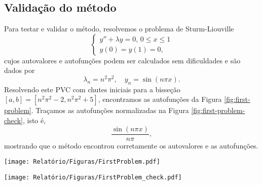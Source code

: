 \documentclass[twocolumn,showpacs,%
  nofootinbib,aps,superscriptaddress,%
  eqsecnum,prd,notitlepage,showkeys,10pt]{revtex4-1}
\renewcommand{\leq}{\leqslant}
\begin{document}
\subsection{Validação do método}\label{subsec:validacao}
%
Para testar e validar o método, resolvemos o problema de Sturm-Liouville
%
\begin{equation}
\label{eq:firstproblem}
    \left\{
        \begin{array}{l}
            y'' + \lambda y = 0, \, 0 \leq x \leq 1 \\
            y(0) = y(1) = 0,
        \end{array}
    \right.
\end{equation}
%
cujos autovalores e autofunções podem ser calculados sem dificuldades e são dados por
%
\[
    \lambda_n = n^2\pi^2, \quad y_n = \sin(n\pi x).
\]
%
Resolvendo este PVC com chutes iniciais para a bisseção $[a,b] = [n^2\pi^2 -2, n^2\pi^2 + 5]$, 
encontramos as autofunções da Figura \ref{fig:first-problem}.
Traçamos as autofunções normalizadas na Figura \ref{fig:first-problem-check}, isto é,
%
\[
    \frac{\sin(n\pi x)}{n\pi},
\]
%
mostrando
que o método encontrou corretamente os autovalores e as autofunções.
%
\begin{figure*}
    \centering
    \begin{minipage}[b]{.49\textwidth}
        \texttt{[image: Relatório/Figuras/FirstProblem.pdf]}
        \caption{Gráficos das primeiras cinco autofunções normalizadas
        encontradas numericamente.}\label{fig:first-problem}
    \end{minipage}\hfill
    \begin{minipage}[b]{.49\textwidth}
        \texttt{[image: Relatório/Figuras/FirstProblem\_check.pdf]}
        \caption{Gráficos das primeiras 5 autofunções normalizadas, $\sin(n\pi x)/(n\pi)$.}\label{fig:first-problem-check}
    \end{minipage}
\end{figure*}
%
%
\end{document}
